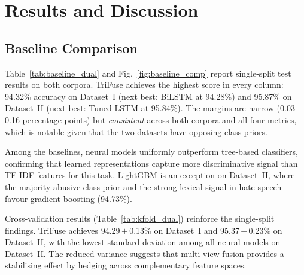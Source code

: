 \documentclass[10pt,twocolumn,a4paper]{article}
\begin{document}
\section{Results and Discussion}\label{sec:results}

\subsection{Baseline Comparison}\label{subsec:quant}

Table~\ref{tab:baseline_dual} and Fig.~\ref{fig:baseline_comp} report single-split test results on both corpora. TriFuse achieves the highest score in every column: 94.32\% accuracy on Dataset~I (next best: BiLSTM at 94.28\%) and 95.87\% on Dataset~II (next best: Tuned LSTM at 95.84\%). The margins are narrow (0.03--0.16 percentage points) but \emph{consistent} across both corpora and all four metrics, which is notable given that the two datasets have opposing class priors.

Among the baselines, neural models uniformly outperform tree-based classifiers, confirming that learned representations capture more discriminative signal than TF-IDF features for this task. LightGBM is an exception on Dataset~II, where the majority-abusive class prior and the strong lexical signal in hate speech favour gradient boosting (94.73\%).

Cross-validation results (Table~\ref{tab:kfold_dual}) reinforce the single-split findings. TriFuse achieves 94.29\,$\pm$\,0.13\% on Dataset~I and 95.37\,$\pm$\,0.23\% on Dataset~II, with the lowest standard deviation among all neural models on Dataset~II. The reduced variance suggests that multi-view fusion provides a stabilising effect by hedging across complementary feature spaces.
\end{document}
